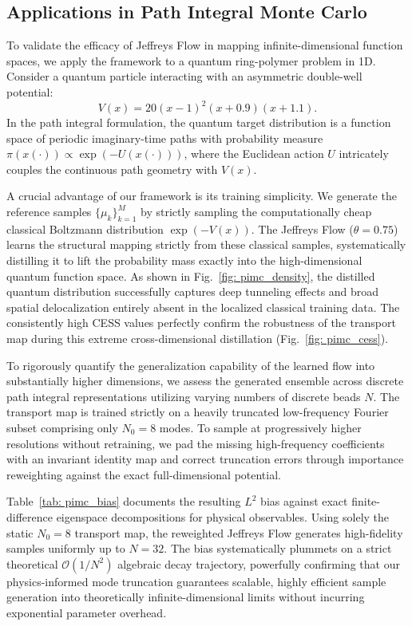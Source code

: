 \documentclass[%
 reprint,
 amsmath,amssymb,
 aps,
 pre,
]{revtex4-2}
\begin{document}
\subsection{Applications in Path Integral Monte Carlo}

To validate the efficacy of Jeffreys Flow in mapping infinite-dimensional function spaces, we apply the framework to a quantum ring-polymer problem in 1D. Consider a quantum particle interacting with an asymmetric double-well potential:
\begin{equation*}
	V(x) = 20(x - 1)^2 (x + 0.9)(x + 1.1).
\end{equation*}
In the path integral formulation, the quantum target distribution is a function space of periodic imaginary-time paths with probability measure $\pi(x(\cdot)) \propto \exp(-U(x(\cdot)))$, where the Euclidean action $U$ intricately couples the continuous path geometry with $V(x)$. 

A crucial advantage of our framework is its training simplicity. We generate the reference samples $\{\mu_k\}_{k=1}^M$ by strictly sampling the computationally cheap classical Boltzmann distribution $\exp(-V(x))$. The Jeffreys Flow ($\theta = 0.75$) learns the structural mapping strictly from these classical samples, systematically distilling it to lift the probability mass exactly into the high-dimensional quantum function space. As shown in Fig.~\ref{fig: pimc_density}, the distilled quantum distribution successfully captures deep tunneling effects and broad spatial delocalization entirely absent in the localized classical training data. The consistently high CESS values perfectly confirm the robustness of the transport map during this extreme cross-dimensional distillation (Fig.~\ref{fig: pimc_cess}).

To rigorously quantify the generalization capability of the learned flow into substantially higher dimensions, we assess the generated ensemble across discrete path integral representations utilizing varying numbers of discrete beads $N$. The transport map is trained strictly on a heavily truncated low-frequency Fourier subset comprising only $N_0 = 8$ modes. To sample at progressively higher resolutions without retraining, we pad the missing high-frequency coefficients with an invariant identity map and correct truncation errors through importance reweighting against the exact full-dimensional potential.

Table~\ref{tab: pimc_bias} documents the resulting $L^2$ bias against exact finite-difference eigenspace decompositions for physical observables. Using solely the static $N_0 = 8$ transport map, the reweighted Jeffreys Flow generates high-fidelity samples uniformly up to $N = 32$. The bias systematically plummets on a strict theoretical $\mathcal{O}(1/N^2)$ algebraic decay trajectory, powerfully confirming that our physics-informed mode truncation guarantees scalable, highly efficient sample generation into theoretically infinite-dimensional limits without incurring exponential parameter overhead.
\end{document}
